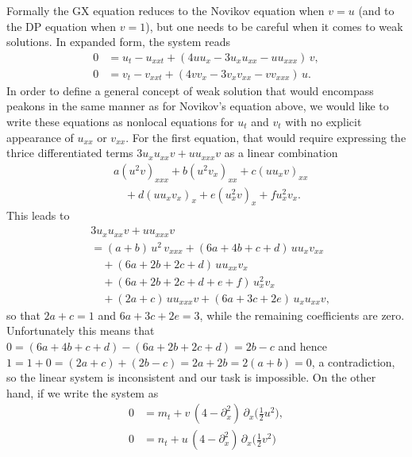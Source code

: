 \documentclass[10pt,a4paper]{article} \pdfoutput=1 
\begin{document}
Formally the GX equation reduces to the Novikov equation when $v=u$ (and to the DP equation when $v=1$),
but one needs to be careful when it comes to weak solutions.
In expanded form, the system reads
\begin{equation}
  \begin{aligned}
    0 &= u_t - u_{xxt} + (4 u u_x - 3 u_x u_{xx} - u u_{xxx}) \, v
    , \\
    0 &= v_t - v_{xxt} + (4 v v_x - 3 v_x v_{xx} - v v_{xxx}) \, u
    .
  \end{aligned}
\end{equation}
In order to define a general concept of weak solution that would
encompass peakons in the same manner as for Novikov's equation above,
we would like to write these equations as nonlocal equations for $u_t$
and $v_t$ with no explicit appearance of $u_{xx}$ or $v_{xx}$.
For the first equation, that would require expressing the thrice differentiated terms
$3 u_x u_{xx} v + u u_{xxx} v$ as a linear combination
\begin{equation*}
  \begin{split}
    &
    a (u^2 v)_{xxx}
    + b (u^2 v_x)_{xx}
    + c (uu_x v)_{xx}
    \\ & \quad
    + d (uu_x v_x)_x
    + e (u_x^2 v)_x
    + f u_x^2 v_x
    .
  \end{split}
\end{equation*}
This leads to
\begin{equation*}
  \begin{split}
    &
    3 u_x u_{xx} v + u u_{xxx} v
    \\ & =
    (a+b) \, u^2 \, v_{xxx}
    + (6a+4b+c+d) \, u u_x v_{xx}
    \\ & \quad
    + (6a+2b+2c+d) \, u u_{xx} v_x
    \\ & \quad
    + (6a+2b+2c+d+e+f) \, u_x^2v_x
    \\ & \quad
    + (2a+c) \, u u_{xxx}v
    + (6a+3c+2e) \, u_x u_{xx} v
    ,
  \end{split}
\end{equation*}
so that $2a+c=1$ and $6a+3c+2e=3$, while the remaining coefficients are zero.
Unfortunately this means that
$0 = (6a+4b+c+d) - (6a+2b+2c+d) = 2b-c$ and hence $1 = 1 + 0 = (2a+c) + (2b-c) = 2a+2b = 2(a+b) = 0$, a contradiction,
so the linear system is inconsistent and our task is impossible.
On the other hand, if we write the system as
\begin{equation}
  \begin{aligned}
    0 &= m_t + v \, (4 - \partial_x^2) \, \partial_x \bigl( \tfrac12 u^2 \bigr)
    , \\
    0 &= n_t + u \, (4 - \partial_x^2) \, \partial_x \bigl( \tfrac12 v^2 \bigr)
  \end{aligned}
\end{equation}
\end{document}
